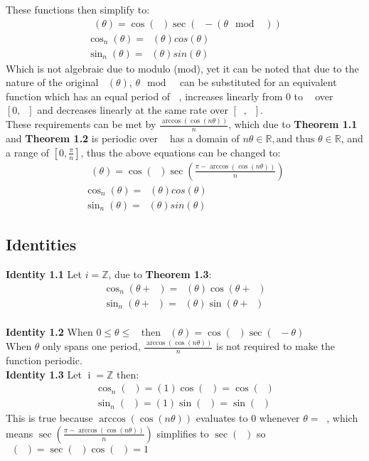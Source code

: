 \documentclass[11pt]{article}
\DeclareMathOperator{\custd}{\mathrm{d}_n}
\DeclareMathOperator{\custh}{\mathrm{h}_n}
\DeclareMathOperator{\custi}{\mathrm{i}}
\DeclareMathOperator{\period}{\frac{2\pi}{n}}
\DeclareMathOperator{\hp}{\frac{\pi}{n}}
\DeclareMathOperator{\iperiod}{\custi\frac{2\pi}{n}}
\begin{document}
These functions then simplify to:
\begin{gather*}
\custd(\theta)=\cos(\hp)\sec(\hp-(\theta\mod\period))\\
\cos_n(\theta)=\custd(\theta)cos(\theta)\\
\sin_n(\theta)=\custd(\theta)sin(\theta)
\end{gather*}
Which is not algebraic due to modulo (mod), yet it can be noted that due to the nature of the original \(\custh(\theta)\), \(\theta\mod\period\) can be substituted for an equivalent function which has an equal period of \(\period\), increases linearly from 0 to \(\hp\) over \([0,\hp]\) and decreases linearly at the same rate over \([\hp,\period]\).\\
These requirements can be met by \(\frac{\arccos(\cos(n\theta))}{n}\), which due to \textbf{Theorem 1.1} and \textbf{Theorem 1.2} is periodic over \(\period\) has a domain of \(n\theta\in\mathbb{R},\text{and thus } \theta\in\mathbb{R}\), and a range of \([0,\frac{\pi}{n}]\), thus the above equations can be changed to:
\begin{gather*}
\custd(\theta)=\cos(\hp)\sec(\frac{\pi-\arccos(\cos(n\theta))}{n})\\
\cos_n(\theta)=\custd(\theta)cos(\theta)\\
\sin_n(\theta)=\custd(\theta)sin(\theta)
\end{gather*}

\subsection{Identities}
\textbf{Identity 1.1} Let \(i=\mathbb{Z}\), due to \textbf{Theorem 1.3}:
\begin{gather*}
\cos_n(\theta+\iperiod) = \custd(\theta)\cos(\theta+\iperiod)\\
\sin_n(\theta+\iperiod) = \custd(\theta)\sin(\theta+\iperiod)
\end{gather*} \\
\textbf{Identity 1.2} When \(0\leq\theta\leq\period\) then \(\custd(\theta)=\cos(\hp)\sec(\hp-\theta)\)\\
When \(\theta\) only spans one period, \(\frac{\arccos(\cos(n\theta))}{n}\) is not required to make the function periodic.\\
\textbf{Identity 1.3} Let \(\custi=\mathbb{Z}\) then:
\begin{gather*}
\cos_n(\iperiod) = (1)\cos(\iperiod)=\cos(\iperiod)\\
\sin_n(\iperiod) = (1)\sin(\iperiod)=\sin(\iperiod)
\end{gather*}
This is true because \(\arccos(\cos(n\theta))\) evaluates to 0 whenever \(\theta=\iperiod\), which means \(\sec(\frac{\pi-\arccos(\cos(n\theta))}{n})\) simplifies to \(\sec(\hp)\) so \(\custd(\iperiod)=\sec(\hp)\cos(\hp)=1\)
\end{document}

